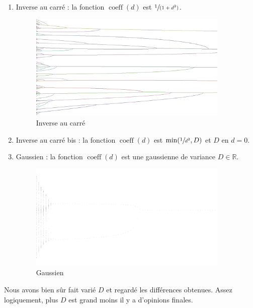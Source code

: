 \documentclass[a4paper,10pt]{article}
\begin{document}
\begin{enumerate}
\item Inverse au carré : la fonction $\operatorname{coeff}(d)$ est $\sfrac{1}{(1+d^2)}$.

\begin{figure}[H]
\begin{center}
\includegraphics[width=270pt]{resultatCarre_inverse.png}
\end{center}
\caption{Inverse au carré}
\label{sim_carre}
\end{figure}

\item Inverse au carré bis : la fonction $\operatorname{coeff}(d)$ est $\min(\sfrac{1}{d^2}, D)$ et $D$ en $d=0$.

\item Gaussien : la fonction $\operatorname{coeff}(d)$ est une gaussienne de variance $D \in \mathbb{R}$.

\begin{figure}[H]
\begin{center}
\includegraphics[width=270pt]{resultatGaussien_inverse.png}
\end{center}
\caption{Gaussien}
\label{sim_gaussien}
\end{figure}

\end{enumerate}

Nous avons bien sûr fait varié $D$ et regardé les différences obtenues. Assez logiquement, plus $D$ est grand moins il y a d'opinions finales.
\end{document}
